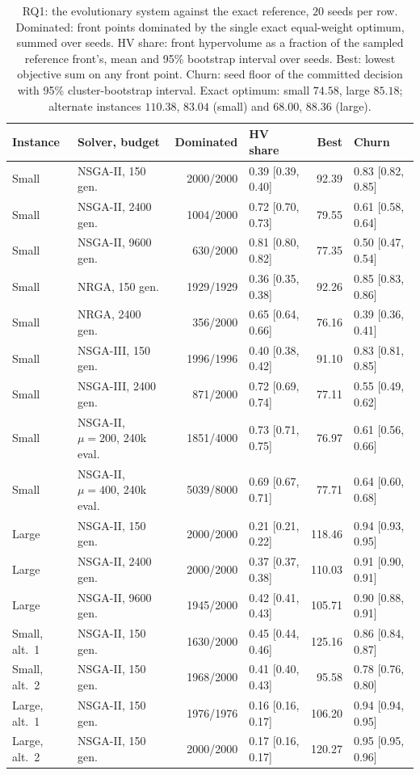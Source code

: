 \documentclass[systems,article,submit,moreauthors,pdftex]{Definitions/mdpi}
\begin{document}
\begin{table}[H]
\centering
\caption{RQ1: the evolutionary system against the exact reference, $20$ seeds per row.
Dominated: front points dominated by the single exact equal-weight optimum, summed over seeds. HV
share: front hypervolume as a fraction of the sampled reference front's, mean and 95\% bootstrap
interval over seeds. Best: lowest objective sum on any front point. Churn: seed floor of the
committed decision with 95\% cluster-bootstrap interval. Exact optimum: small $74.58$, large
$85.18$; alternate instances $110.38$, $83.04$ (small) and $68.00$, $88.36$ (large).\label{tab:rq1}}
\footnotesize
\setlength{\tabcolsep}{4pt}
\begin{tabular}{llrlrl}
\toprule
Instance & Solver, budget & Dominated & HV share & Best & Churn\\
\midrule
Small & NSGA-II, 150 gen. & 2000/2000 & 0.39 [0.39, 0.40] & 92.39 & 0.83 [0.82, 0.85]\\
Small & NSGA-II, 2400 gen. & 1004/2000 & 0.72 [0.70, 0.73] & 79.55 & 0.61 [0.58, 0.64]\\
Small & NSGA-II, 9600 gen. & 630/2000 & 0.81 [0.80, 0.82] & 77.35 & 0.50 [0.47, 0.54]\\
Small & NRGA, 150 gen. & 1929/1929 & 0.36 [0.35, 0.38] & 92.26 & 0.85 [0.83, 0.86]\\
Small & NRGA, 2400 gen. & 356/2000 & 0.65 [0.64, 0.66] & 76.16 & 0.39 [0.36, 0.41]\\
Small & NSGA-III, 150 gen. & 1996/1996 & 0.40 [0.38, 0.42] & 91.10 & 0.83 [0.81, 0.85]\\
Small & NSGA-III, 2400 gen. & 871/2000 & 0.72 [0.69, 0.74] & 77.11 & 0.55 [0.49, 0.62]\\
Small & NSGA-II, $\mu=200$, 240k eval. & 1851/4000 & 0.73 [0.71, 0.75] & 76.97 & 0.61 [0.56, 0.66]\\
Small & NSGA-II, $\mu=400$, 240k eval. & 5039/8000 & 0.69 [0.67, 0.71] & 77.71 & 0.64 [0.60, 0.68]\\
Large & NSGA-II, 150 gen. & 2000/2000 & 0.21 [0.21, 0.22] & 118.46 & 0.94 [0.93, 0.95]\\
Large & NSGA-II, 2400 gen. & 2000/2000 & 0.37 [0.37, 0.38] & 110.03 & 0.91 [0.90, 0.91]\\
Large & NSGA-II, 9600 gen. & 1945/2000 & 0.42 [0.41, 0.43] & 105.71 & 0.90 [0.88, 0.91]\\
\midrule
Small, alt.\ 1 & NSGA-II, 150 gen. & 1630/2000 & 0.45 [0.44, 0.46] & 125.16 & 0.86 [0.84, 0.87]\\
Small, alt.\ 2 & NSGA-II, 150 gen. & 1968/2000 & 0.41 [0.40, 0.43] & 95.58 & 0.78 [0.76, 0.80]\\
Large, alt.\ 1 & NSGA-II, 150 gen. & 1976/1976 & 0.16 [0.16, 0.17] & 106.20 & 0.94 [0.94, 0.95]\\
Large, alt.\ 2 & NSGA-II, 150 gen. & 2000/2000 & 0.17 [0.16, 0.17] & 120.27 & 0.95 [0.95, 0.96]\\
\bottomrule
\end{tabular}
\end{table}
\end{document}
